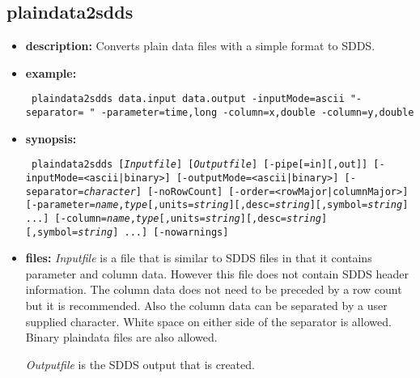 %
%
\begin{latexonly}
\newpage
\end{latexonly}
\subsection{plaindata2sdds}
\label{plaindata2sdds}

\begin{itemize}
\item {\bf description:} Converts plain data files with a simple format to SDDS.
\item {\bf example:} 
\begin{flushleft}{\tt
plaindata2sdds data.input data.output -inputMode=ascii "-separator= " -parameter=time,long -column=x,double -column=y,double
}\end{flushleft}
\item {\bf synopsis:}
\begin{flushleft}{\tt
plaindata2sdds [{\em Inputfile}] [{\em Outputfile}] [-pipe[=in][,out]] 
[-inputMode=<ascii|binary>]
[-outputMode=<ascii|binary>]
[-separator={\em character}]
[-noRowCount]
[-order=<rowMajor|columnMajor>]
[-parameter={\em name},{\em type}[,units={\em string}][,desc={\em string}][,symbol={\em string}] ...]
[-column={\em name},{\em type}[,units={\em string}][,desc={\em string}][,symbol={\em string}] ...]
[-nowarnings]
}\end{flushleft}
\item {\bf files: }
{\em Inputfile} is a file that is similar to SDDS files in that it contains parameter and column data. However this file does not contain SDDS header information. The column data does not need to be preceded by a row count but it is recommended. Also the column data can be separated by a user supplied character. White space on either side of the separator is allowed. Binary plaindata files are also allowed.

{\em Outputfile} is the SDDS output that is created.


\end{itemize}
